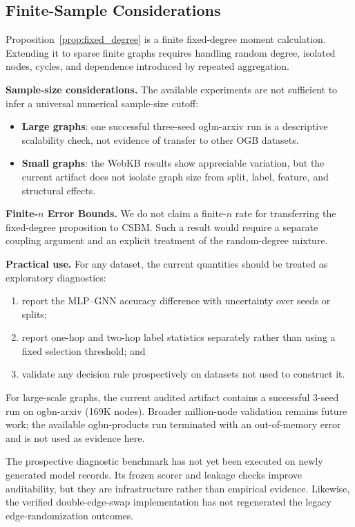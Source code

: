 \subsection{Finite-Sample Considerations}

Proposition~\ref{prop:fixed_degree} is a finite fixed-degree moment calculation. Extending it to sparse finite graphs requires handling random degree, isolated nodes, cycles, and dependence introduced by repeated aggregation.

\textbf{Sample-size considerations.} The available experiments are not sufficient to infer a universal numerical sample-size cutoff:
\begin{itemize}
    \item \textbf{Large graphs}: one successful three-seed ogbn-arxiv run is a descriptive scalability check, not evidence of transfer to other OGB datasets.
    \item \textbf{Small graphs}: the WebKB results show appreciable variation, but the current artifact does not isolate graph size from split, label, feature, and structural effects.
\end{itemize}

\textbf{Finite-$n$ Error Bounds.} We do not claim a finite-$n$ rate for transferring the fixed-degree proposition to CSBM. Such a result would require a separate coupling argument and an explicit treatment of the random-degree mixture.

\textbf{Practical use.} For any dataset, the current quantities should be treated as exploratory diagnostics:
\begin{enumerate}
    \item report the MLP--GNN accuracy difference with uncertainty over seeds or splits;
    \item report one-hop and two-hop label statistics separately rather than using a fixed selection threshold; and
    \item validate any decision rule prospectively on datasets not used to construct it.
\end{enumerate}

For large-scale graphs, the current audited artifact contains a successful 3-seed run on ogbn-arxiv (169K nodes). Broader million-node validation remains future work; the available ogbn-products run terminated with an out-of-memory error and is not used as evidence here.

The prospective diagnostic benchmark has not yet been executed on newly generated model records. Its frozen scorer and leakage checks improve auditability, but they are infrastructure rather than empirical evidence. Likewise, the verified double-edge-swap implementation has not regenerated the legacy edge-randomization outcomes.

